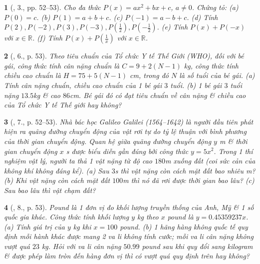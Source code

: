 \documentclass{article}
\newtheorem{baitoan}{}
\begin{document}
\begin{baitoan}[\cite{SGK_Toan_7_Canh_Dieu_tap_2}, 3., pp. 52--53]
	Cho đa thức $P(x) = ax^2 + bx + c$, $a\ne0$. Chứng tỏ: (a) $P(0) = c$. (b) $P(1) = a + b + c$. (c) $P(-1) = a - b + c$. (d) Tính $P(2),P(-2),P(3),P(-3),P\left(\frac{1}{2}\right),P\left(-\frac{1}{2}\right)$. (e) Tính $P(x) + P(-x)$ với $x\in\mathbb{R}$. (f) Tính $P(x) + P\left(\frac{1}{x}\right)$ với $x\in\mathbb{R}$.
\end{baitoan}

\begin{baitoan}[\cite{SGK_Toan_7_Canh_Dieu_tap_2}, 6., p. 53]
	Theo tiêu chuẩn của Tổ chức Y tế Thế Giới (WHO), đối với bé gái, công thức tính cân nặng chuẩn là $C = 9 + 2(N - 1)$ \emph{kg}, công thức tính chiều cao chuẩn là $H = 75 + 5(N - 1)$ \emph{cm}, trong đó $N$ là số tuổi của bé gái. (a) Tính cân nặng chuẩn, chiều cao chuẩn của 1 bé gái $3$ tuổi. (b) 1 bé gái $3$ tuổi nặng $13.5$\emph{kg} \& cao $86$\emph{cm}. Bé gái đó có đạt tiêu chuẩn về cân nặng \& chiều cao của Tổ chức Y tế Thế giới hay không?
\end{baitoan}

\begin{baitoan}[\cite{SGK_Toan_7_Canh_Dieu_tap_2}, 7., p. 52--53]
	Nhà bác học Galileo Galilei (1564--1642) là người đầu tiên phát hiện ra quãng đường chuyển động của vật rơi tự do tỷ lệ thuận với bình phương của thời gian chuyển động. Quan hệ giữa quãng đường chuyển động $y$ \emph{m} \& thời gian chuyển động $x$ \emph{s} được biểu diễn gần đúng bởi công thức $y = 5x^2$. Trong 1 thí nghiệm vật lý, người ta thả 1 vật nặng từ độ cao $180$\emph{m} xuống đất (coi sức cản của không khí không đáng kể). (a) Sau $3$\emph{s} thì vật nặng còn cách mặt đất bao nhiêu \emph{m}? (b) Khi vật nặng còn cách mặt đất $100$\emph{m} thì nó đã rơi được thời gian bao lâu? (c) Sau bao lâu thì vật chạm đất?
\end{baitoan}

\begin{baitoan}[\cite{SGK_Toan_7_Canh_Dieu_tap_2}, 8., p. 53]
	Pound là 1 đơn vị đo khối lượng truyền thống của Anh, Mỹ \& 1 số quốc gia khác. Công thức tính khối lượng $y$ \emph{kg} theo $x$ pound là $y = 0.45359237x$. (a) Tính giá trị của $y$ \emph{kg} khi $x = 100$ pound. (b) 1 hãng hàng không quốc tế quy định mỗi hành khác được mang 2 va li không tính cước; mỗi va li cân nặng không vượt quá $23$ \emph{kg}. Hỏi với va li cân nặng $50.99$ pound sau khi quy đổi sang kilogram \& được phép làm tròn đến hàng đơn vị thì có vượt quá quy định trên hay không?
\end{baitoan}
\end{document}
